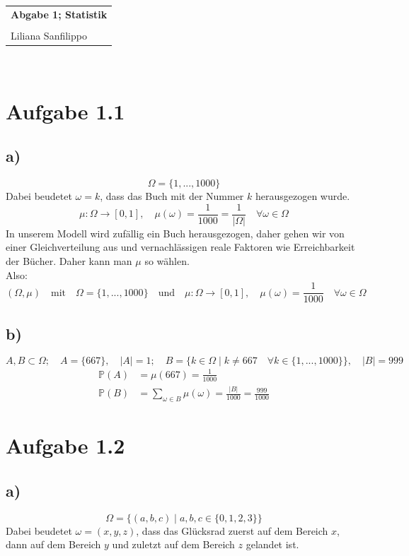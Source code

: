 \documentclass{article} %
\newcommand{\titulo}{Abgabe 1; Statistik}
\newcommand{\nombre}{Liliana Sanfilippo}
\begin{document}
\begin{tabular}{p{12cm}}
{{\Large\bf\titulo}}\\
\vspace{0.2cm}\\
 {\large\nombre}\\
\end{tabular}
\vspace{0.2cm}\\
\section{Aufgabe 1.1}
\subsection{a)}
\[
\Omega = \{1, ... , 1000\}
\]
Dabei beudetet $\omega = k$, dass das Buch mit der Nummer $k$ herausgezogen wurde. 
\[
\mu: \Omega \rightarrow [0,1], \quad \mu(\omega) = \frac{1}{1000} = \frac{1}{|\Omega|} \quad \forall \omega \in \Omega
\]
In unserem Modell wird zufällig ein Buch herausgezogen, daher gehen wir von einer Gleichverteilung aus und vernachlässigen reale Faktoren wie Erreichbarkeit der Bücher. Daher kann man $\mu$ so wählen. \\
Also: 
\[
(\Omega, \mu) \quad \text{mit} \quad \Omega = \{1, ... , 1000\} \quad \text{und} \quad \mu: \Omega \rightarrow [0,1], \quad \mu(\omega) = \frac{1}{1000} \quad \forall \omega \in \Omega
\]
\subsection{b)}
\[
A, B \subset \Omega; \quad A = \{667\}, \quad |A| = 1; \quad B = \{k \in \Omega \mid k \neq 667 \quad \forall k \in \{1, ..., 1000\}\}, \quad |B| = 999
\]
\begin{align*}
    \mathbb{P}(A) & = \mu(667) = \frac{1}{1000} \\
    \mathbb{P}(B) & = \sum_{\omega \in B} \mu(\omega) = \frac{|B|}{1000} = \frac{999}{1000}
\end{align*}
\section{Aufgabe 1.2}
\subsection{a)}
\[
\Omega = \{(a,b,c) \mid a,b,c \in \{0,1,2,3\}\}
\]
Dabei beudetet $\omega = (x,y,z)$, dass das Glücksrad zuerst auf dem Bereich $x$, dann auf dem Bereich $y$ und zuletzt auf dem Bereich $z$ gelandet ist.  
\end{document}
